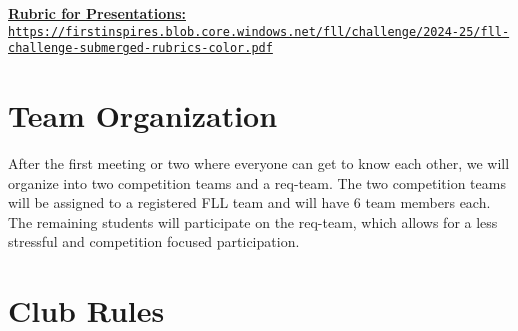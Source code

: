 \documentclass[letter]{article}
\begin{document}
\href{https://firstinspires.blob.core.windows.net/fll/challenge/2024-25/fll-challenge-submerged-rubrics-color.pdf}{\textbf{Rubric for Presentations:} \nolinkurl{https://firstinspires.blob.core.windows.net/fll/challenge/2024-25/fll-challenge-submerged-rubrics-color.pdf}}

\section{Team Organization}

After the first meeting or two where everyone can get to know each other, we will organize into two competition teams and a req-team.  The two competition teams will be assigned to a registered FLL team and will have 6 team members each.  The remaining students will participate on the req-team, which allows for a less stressful and competition focused participation.  

\section{Club Rules}
\end{document}
